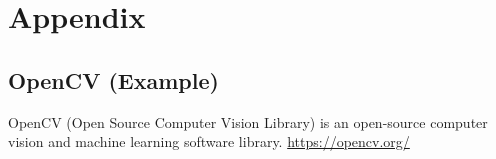 \section{Appendix}
\label{sec:appendixx}

\subsection{OpenCV (Example)}
OpenCV (Open Source Computer Vision Library) is an open-source computer vision and machine learning software library. \url{https://opencv.org/}


